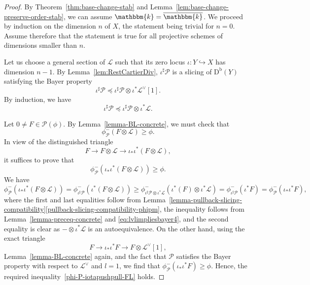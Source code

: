 \documentclass[11pt, reqno]{amsart}
\numberwithin{equation}{section}
\theoremstyle{plain}
\theoremstyle{remark}
\theoremstyle{definition}
\theoremstyle{italicsname}
\newcommand{\Db}{\mathrm{D^b}}
\newcommand{\cL}{\mathcal{L}}
\newcommand{\cP}{\mathscr{P}}
\newcommand{\KK}{\mathbbm{k}}
\begin{document}
\begin{proof}
By Theorem~\ref{thm:base-change-stab} and Lemma~\ref{lem:base-change-preserve-order-stab}, we can assume $\KK=\overline{\KK}$.
We proceed by induction on the dimension $n$ of $X$, the statement being trivial for $n=0$.
Assume therefore that the statement is true for all projective schemes of dimensions smaller than $n$.

Let us choose a general section of $\cL$ such that its zero locus $\iota\colon Y\hookrightarrow X$ has dimension $n-1$.
By Lemma~\ref{lem:RestCartierDiv}, $\iota^\sharp\cP$ is a slicing of $\Db(Y)$ satisfying the Bayer property
\begin{equation*}\label{eq:lvlimpliesbayer3}
\iota^\sharp\cP\preceq\iota^\sharp\cP\otimes\iota^*\cL^\vee[1].    
\end{equation*}
By induction, we have
\begin{equation}\label{eq:lvlimpliesbayer4}
\iota^\sharp\cP\preceq\iota^\sharp\cP\otimes\iota^*\cL.    
\end{equation}

Let $0 \neq F\in\cP(\phi)$.
By Lemma~\ref{lemma-BL-concrete}, we must check that 
\[
\phi_{\cP}^-(F\otimes\cL)\geq\phi.
\]
In view of the distinguished triangle
\begin{equation*}
    F\longrightarrow F\otimes\cL \longrightarrow \iota_*\iota^*(F\otimes\cL), 
\end{equation*}
it suffices to prove that 
\begin{equation}
\label{phi-P-iotapushpull-FL} \phi^-_{\cP}(\iota_*\iota^*(F\otimes\cL))\geq\phi.
\end{equation}
We have 
\begin{equation*}
    \phi^{-}_{\cP}(\iota_*\iota^*(F\otimes\cL)) 
    = \phi^-_{\iota^{\sharp}\cP}(\iota^*(F\otimes\cL)) \geq \phi^-_{\iota^{\sharp} \cP \otimes \iota^*\cL}(\iota^*(F) \otimes \iota^*\cL) 
    = \phi^-_{\iota^\sharp\cP}(\iota^*F)  
    = \phi^-_{\cP}(\iota_*\iota^*F),
\end{equation*}
where the first and last equalities follow from Lemma~\ref{lemma-pullback-slicing-compatibility}\ref{pullback-slicing-compatibility-phipm}, the inequality follows from Lemma~\ref{lemma-preceq-concrete} and \eqref{eq:lvlimpliesbayer4}, and the second equality is clear as $-\otimes \iota^*\cL$ is an autoequivalence. 
On the other hand, using the exact triangle 
\begin{equation*}
    F \longrightarrow \iota_*\iota^* F\longrightarrow F\otimes\cL^\vee[1], 
\end{equation*}
Lemma~\ref{lemma-BL-concrete}
again, and the fact that $\cP$ satisfies the Bayer property with respect to $\cL^{\vee}$ and $l = 1$, we find that $\phi^-_{\cP}(\iota_*\iota^*F)\geq\phi$. 
Hence, the required inequality~\eqref{phi-P-iotapushpull-FL} holds.
\end{proof}
\end{document}
